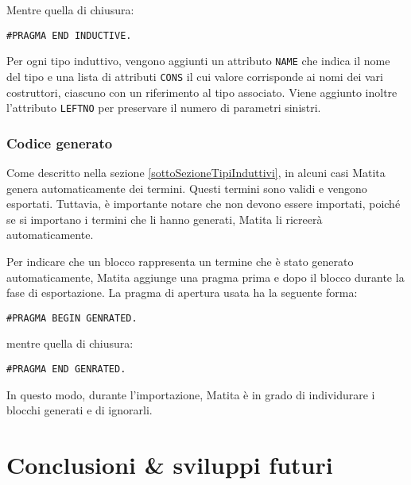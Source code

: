 \documentclass[12pt,a4paper]{mimosis}
\begin{document}
Mentre quella di chiusura:
\begin{center}
  \texttt{\#PRAGMA END INDUCTIVE.}
\end{center}

Per ogni tipo induttivo, vengono aggiunti un attributo \texttt{NAME} che indica 
il nome del tipo e una lista di attributi \texttt{CONS} il cui valore corrisponde
ai nomi dei vari costruttori, ciascuno con un riferimento al tipo associato.
Viene aggiunto inoltre l'attributo \texttt{LEFTNO} per preservare il numero di
parametri sinistri.

\subsection{Codice generato}
Come descritto nella sezione \ref{sottoSezioneTipiInduttivi}, in alcuni casi
Matita genera automaticamente dei termini. Questi termini sono validi e vengono
esportati. Tuttavia, è importante notare che non devono essere importati, poiché
se si importano i termini che li hanno generati, Matita li ricreerà automaticamente.

Per indicare che un blocco rappresenta un termine che è stato generato automaticamente,
Matita aggiunge una pragma prima e dopo il blocco durante la fase di esportazione.
La pragma di apertura usata ha la seguente forma:
\begin{center}
  \texttt{\#PRAGMA BEGIN GENRATED.}
\end{center}

mentre quella di chiusura:
\begin{center}
  \texttt{\#PRAGMA END GENRATED.}
\end{center}

In questo modo, durante l'importazione, Matita è in grado di individurare i
blocchi generati e di ignorarli.



\chapter{Conclusioni \& sviluppi futuri}

\printbibliography


\end{document}

